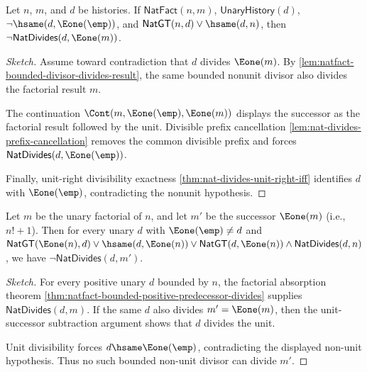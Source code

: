\begin{lemma}
\label{lem:natfact-successor-no-bounded-nonunit-divisor}
Let $n$, $m$, and $d$ be histories. If $\mathsf{NatFact}(n,m)$,
$\mathsf{UnaryHistory}(d)$, $\neg\hsame(d,\Eone(\emp))$, and
$\mathsf{NatGT}(n,d)\vee\hsame(d,n)$, then
$\neg\mathsf{NatDivides}(d,\Eone(m))$.
\end{lemma}
\begin{proof}[Sketch]
Assume toward contradiction that $d$ divides $\Eone(m)$. By
\autoref{lem:natfact-bounded-divisor-divides-result}, the same bounded
nonunit divisor also divides the factorial result $m$.

The continuation $\Cont(m,\Eone(\emp),\Eone(m))$ displays the successor as the
factorial result followed by the unit. Divisible prefix cancellation
\autoref{lem:nat-divides-prefix-cancellation} removes the common divisible
prefix and forces $\mathsf{NatDivides}(d,\Eone(\emp))$.

Finally, unit-right divisibility exactness
\autoref{thm:nat-divides-unit-right-iff} identifies $d$ with
$\Eone(\emp)$, contradicting the nonunit hypothesis.
\end{proof}

\begin{lemma}
\label{lem:fact-plus-one-coprime}
Let \(m\) be the unary factorial of \(n\), and let \(m'\) be the successor \(\Eone(m)\) (i.e., \(n! + 1\)). Then for every unary \(d\) with \(\Eone(\emp) \neq d\) and \(\mathsf{NatGT}(\Eone(n), d) \vee \hsame(d, \Eone(n)) \vee \mathsf{NatGT}(d, \Eone(n)) \wedge \mathsf{NatDivides}(d, n)\), we have \(\neg \mathsf{NatDivides}(d, m')\).
\end{lemma}
\begin{proof}[Sketch]
For every positive unary $d$ bounded by $n$, the factorial absorption theorem
\autoref{thm:natfact-bounded-positive-predecessor-divides} supplies
$\mathsf{NatDivides}(d,m)$. If the same $d$ also divides $m'=\Eone(m)$, then
the unit-successor subtraction argument shows that $d$ divides the unit.

Unit divisibility forces $d\hsame\Eone(\emp)$, contradicting the displayed
non-unit hypothesis. Thus no such bounded non-unit divisor can divide
$m'$.
\end{proof}

